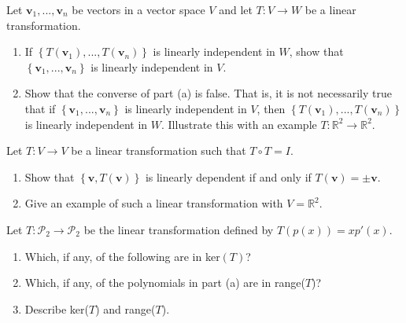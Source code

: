 \documentclass[11pt,letterpaper,boxed]{hmcpset}
\newcommand{\R}{\mathbb{R}}
\newcommand{\pn}[1]{\left( #1 \right)}
\newcommand{\crb}[1]{\left\{ #1 \right\}}
\newcommand{\VEC}[1]{\ensuremath{\mathbf{#1}}\xspace}
\begin{document}
\begin{solution}
\vfill
\end{solution}
\newpage

\begin{problem}[Poole 6.4 \#24]
Let $\VEC{v}_1,...,\VEC{v}_n$ be vectors in a vector space $V$ and let $T: V \rightarrow W$ be a linear transformation.
\begin{enumerate}
\item If $\crb{T\pn{\VEC{v}_1},...,T\pn{\VEC{v}_n}}$ is linearly independent in $W$, show that $\crb{\VEC{v}_1,...,\VEC{v}_n}$ is
linearly independent in $V$.
\item Show that the converse of part (a) is false. That is, it is not necessarily true that 
if $\crb{\VEC{v}_1,...,\VEC{v}_n}$ is linearly independent in $V$, then $\crb{T\pn{\VEC{v}_1},..., T\pn{\VEC{v}_n}}$ is linearly independent in $W$. 
Illustrate this with an example $T: \R^2 \rightarrow \R^2.$
\end{enumerate}
\end{problem}

\begin{solution}
\vfill
\end{solution}
\newpage

\begin{problem}[Poole 6.4 \#32]
Let $T: V \rightarrow V$ be a linear transformation such that $T \circ T = I$.
\begin{enumerate}
\item Show that $\crb{\VEC{v},T(\VEC{v})}$ is linearly dependent if and only if $T(\VEC{v})=\pm\VEC{v}$.
\item Give an example of such a linear transformation with $V = \R^2$.
\end{enumerate}
\end{problem}

\begin{solution}
\vfill
\end{solution}
\newpage

\begin{problem}[Poole 6.5 \#4]
Let $T: \mathcal{P}_2 \rightarrow \mathcal{P}_2$ be the linear transformation defined by
$T(p(x)) = xp'(x)$.
\begin{enumerate}
\item Which, if any, of the following are in ker$(T)$?\\
\item Which, if any, of the polynomials in part (a) are in range($T$)?
\item Describe ker($T$) and range($T$).
\end{enumerate}
\end{problem}
\end{document}
